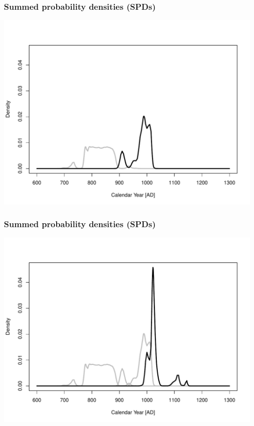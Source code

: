 \documentclass{beamer}
\begin{document}
\begin{frame}[t]
  \frametitle{Summed probability densities (SPDs)}
    \includegraphics[height=.85\textheight]{spd2.pdf}
\end{frame}

\begin{frame}[t]
  \frametitle{Summed probability densities (SPDs)}
    \includegraphics[height=.85\textheight]{spd3.pdf}
\end{frame}
\end{document}
